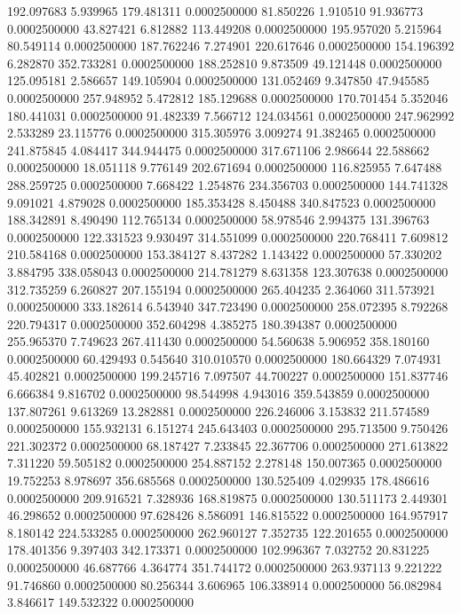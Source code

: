 192.097683 5.939965 179.481311 0.0002500000
81.850226 1.910510 91.936773 0.0002500000
43.827421 6.812882 113.449208 0.0002500000
195.957020 5.215964 80.549114 0.0002500000
187.762246 7.274901 220.617646 0.0002500000
154.196392 6.282870 352.733281 0.0002500000
188.252810 9.873509 49.121448 0.0002500000
125.095181 2.586657 149.105904 0.0002500000
131.052469 9.347850 47.945585 0.0002500000
257.948952 5.472812 185.129688 0.0002500000
170.701454 5.352046 180.441031 0.0002500000
91.482339 7.566712 124.034561 0.0002500000
247.962992 2.533289 23.115776 0.0002500000
315.305976 3.009274 91.382465 0.0002500000
241.875845 4.084417 344.944475 0.0002500000
317.671106 2.986644 22.588662 0.0002500000
18.051118 9.776149 202.671694 0.0002500000
116.825955 7.647488 288.259725 0.0002500000
7.668422 1.254876 234.356703 0.0002500000
144.741328 9.091021 4.879028 0.0002500000
185.353428 8.450488 340.847523 0.0002500000
188.342891 8.490490 112.765134 0.0002500000
58.978546 2.994375 131.396763 0.0002500000
122.331523 9.930497 314.551099 0.0002500000
220.768411 7.609812 210.584168 0.0002500000
153.384127 8.437282 1.143422 0.0002500000
57.330202 3.884795 338.058043 0.0002500000
214.781279 8.631358 123.307638 0.0002500000
312.735259 6.260827 207.155194 0.0002500000
265.404235 2.364060 311.573921 0.0002500000
333.182614 6.543940 347.723490 0.0002500000
258.072395 8.792268 220.794317 0.0002500000
352.604298 4.385275 180.394387 0.0002500000
255.965370 7.749623 267.411430 0.0002500000
54.560638 5.906952 358.180160 0.0002500000
60.429493 0.545640 310.010570 0.0002500000
180.664329 7.074931 45.402821 0.0002500000
199.245716 7.097507 44.700227 0.0002500000
151.837746 6.666384 9.816702 0.0002500000
98.544998 4.943016 359.543859 0.0002500000
137.807261 9.613269 13.282881 0.0002500000
226.246006 3.153832 211.574589 0.0002500000
155.932131 6.151274 245.643403 0.0002500000
295.713500 9.750426 221.302372 0.0002500000
68.187427 7.233845 22.367706 0.0002500000
271.613822 7.311220 59.505182 0.0002500000
254.887152 2.278148 150.007365 0.0002500000
19.752253 8.978697 356.685568 0.0002500000
130.525409 4.029935 178.486616 0.0002500000
209.916521 7.328936 168.819875 0.0002500000
130.511173 2.449301 46.298652 0.0002500000
97.628426 8.586091 146.815522 0.0002500000
164.957917 8.180142 224.533285 0.0002500000
262.960127 7.352735 122.201655 0.0002500000
178.401356 9.397403 342.173371 0.0002500000
102.996367 7.032752 20.831225 0.0002500000
46.687766 4.364774 351.744172 0.0002500000
263.937113 9.221222 91.746860 0.0002500000
80.256344 3.606965 106.338914 0.0002500000
56.082984 3.846617 149.532322 0.0002500000
